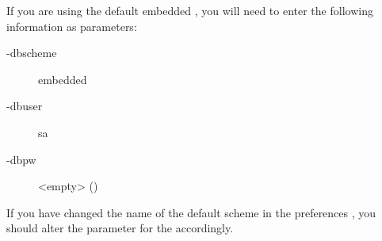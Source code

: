 
If you are using the default embedded \gddb{}, you will need to enter the following information as parameters:
\begin{description}
\item[-dbscheme]{embedded}
\item[-dbuser]{sa}
\item[-dbpw]{<empty> ()}

\end{description}
If you have changed the name of the default \gddb{} scheme in the \gddb{} preferences , you should alter the parameter for the  accordingly. 
